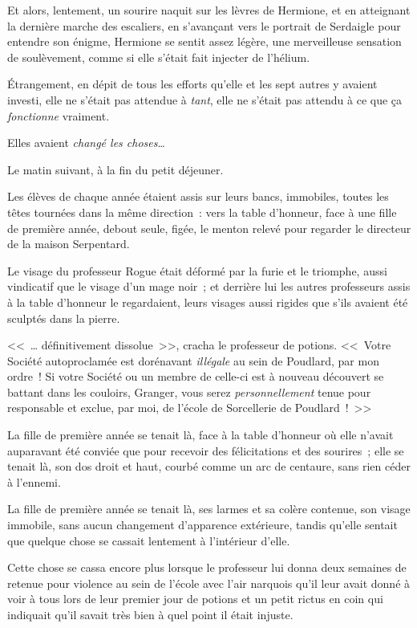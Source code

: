 Et alors, lentement, un sourire naquit sur les lèvres de Hermione, et en atteignant la dernière marche des escaliers, en s'avançant vers le portrait de Serdaigle pour entendre son énigme, Hermione se sentit assez légère, une merveilleuse sensation de soulèvement, comme si elle s'était fait injecter de l'hélium.

Étrangement, en dépit de tous les efforts qu'elle et les sept autres y avaient investi, elle ne s'était pas attendue à \emph{tant}, elle ne s'était pas attendu à ce que ça \emph{fonctionne} vraiment.

Elles avaient \emph{changé les choses}…

\later

Le matin suivant, à la fin du petit déjeuner.

Les élèves de chaque année étaient assis sur leurs bancs, immobiles, toutes les têtes tournées dans la même direction~: vers la table d'honneur, face à une fille de première année, debout seule, figée, le menton relevé pour regarder le directeur de la maison Serpentard.

Le visage du professeur Rogue était déformé par la furie et le triomphe, aussi vindicatif que le visage d'un mage noir~; et derrière lui les autres professeurs assis à la table d'honneur le regardaient, leurs visages aussi rigides que s'ils avaient été sculptés dans la pierre.

<<~… définitivement dissolue~>>, cracha le professeur de potions. <<~Votre Société autoproclamée est dorénavant \emph{illégale} au sein de Poudlard, par mon ordre~! Si votre Société ou un membre de celle-ci est à nouveau découvert se battant dans les couloirs, Granger, vous serez \emph{personnellement} tenue pour responsable et exclue, par moi, de l'école de Sorcellerie de Poudlard~!~>>

La fille de première année se tenait là, face à la table d'honneur où elle n'avait auparavant été conviée que pour recevoir des félicitations et des sourires~; elle se tenait là, son dos droit et haut, courbé comme un arc de centaure, sans rien céder à l'ennemi.

La fille de première année se tenait là, ses larmes et sa colère contenue, son visage immobile, sans aucun changement d'apparence extérieure, tandis qu'elle sentait que quelque chose se cassait lentement à l'intérieur d'elle.

Cette chose se cassa encore plus lorsque le professeur lui donna deux semaines de retenue pour violence au sein de l'école avec l'air narquois qu'il leur avait donné à voir à tous lors de leur premier jour de potions et un petit rictus en coin qui indiquait qu'il savait très bien à quel point il était injuste.


